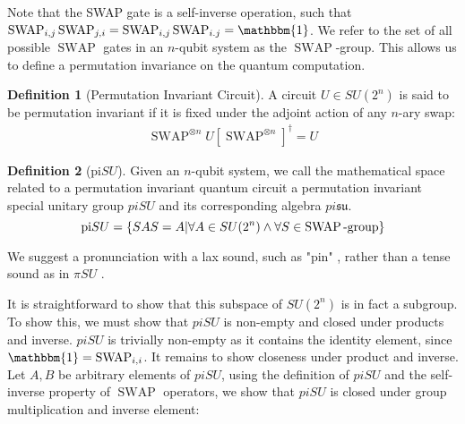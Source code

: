 \documentclass[%
 reprint,
 amsmath,amssymb,
 aps,
]{revtex4-2}
\newcommand{\SWAP}{\operatorname{SWAP}}
\theoremstyle{definition}%
\newtheorem{definition}{Definition}[section]
\begin{document}
Note that the SWAP gate is a self-inverse operation, such that $\SWAP_{i,j} \SWAP_{j,i} = \SWAP_{i,j} \SWAP_{i.j} = \mathbbm{1}$. We refer to the set of all possible $\operatorname{SWAP}$ gates in an $n$-qubit system as the $\operatorname{SWAP}$-group. This allows us to define a permutation invariance on the quantum computation.

\begin{definition}[Permutation Invariant Circuit]
A circuit $U \in SU(2^n)$ is said to be permutation invariant if it is fixed under the adjoint action of any $n$-ary swap:
\begin{align}
    \operatorname{SWAP}^{\otimes n} U \left[\operatorname{SWAP}^{\otimes n}\right]^\dagger=  U \label{eq:main-definition}
\end{align}
\end{definition}





\begin{definition}[pi$SU$]
Given an $n$-qubit system, we call the mathematical space related to a permutation invariant quantum circuit a permutation invariant special unitary group $piSU$ and its corresponding algebra $pi\mathfrak{su}$. 
\begin{equation*}
    \textnormal{pi}SU = \{ S A S=A | \forall A \in SU(2^n) \wedge \forall S\in   \SWAP \textnormal{-group} \}
\end{equation*}
\end{definition}

We suggest a pronunciation with a lax sound, such as "pin" \textipa{[pI]}, rather than a tense sound as in $\pi SU$ \textipa{[paI]}.


    It is straightforward to show that this subspace of $SU(2^n)$ is in fact a subgroup. To show this, we must show that $piSU$ is non-empty and closed under products and inverse. $piSU$ is trivially non-empty as it contains the identity element, since $\mathbbm{1}= \SWAP_{i,i}$. It remains to show closeness under product and inverse. Let $A,B$ be arbitrary elements of $piSU$, using the definition of $piSU$ and the self-inverse property of $\SWAP$ operators, we show that $piSU$ is closed under group multiplication and inverse element:
    
\end{document}
